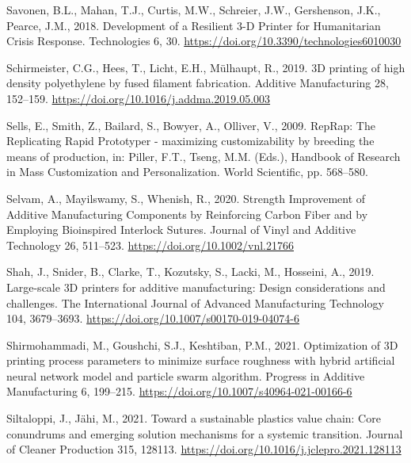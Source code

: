 \documentclass[
  12pt,
]{article}
\newlength{\cslhangindent}
\newlength{\cslentryspacingunit} %
\newenvironment{CSLReferences}[2] %
 {%
  \setlength{\parindent}{0pt}
  \ifodd #1
  \let\oldpar\par
  \def\par{\hangindent=\cslhangindent\oldpar}
  \fi
  \setlength{\parskip}{#2\cslentryspacingunit}
 }%
 {}
\begin{document}
\begin{CSLReferences}{1}{0}
\leavevmode{}%
Savonen, B.L., Mahan, T.J., Curtis, M.W., Schreier, J.W., Gershenson,
J.K., Pearce, J.M., 2018. Development of a {Resilient} 3-{D Printer} for
{Humanitarian Crisis Response}. Technologies 6, 30.
\url{https://doi.org/10.3390/technologies6010030}

\leavevmode{}%
Schirmeister, C.G., Hees, T., Licht, E.H., Mülhaupt, R., 2019. {3D}
printing of high density polyethylene by fused filament fabrication.
Additive Manufacturing 28, 152--159.
\url{https://doi.org/10.1016/j.addma.2019.05.003}

\leavevmode{}%
Sells, E., Smith, Z., Bailard, S., Bowyer, A., Olliver, V., 2009.
{RepRap}: {The Replicating Rapid Prototyper} - maximizing
customizability by breeding the means of production, in: Piller, F.T.,
Tseng, M.M. (Eds.), Handbook of {Research} in {Mass Customization} and
{Personalization}. {World Scientific}, pp. 568--580.

\leavevmode{}%
Selvam, A., Mayilswamy, S., Whenish, R., 2020. Strength {Improvement} of
{Additive Manufacturing Components} by {Reinforcing Carbon Fiber} and by
{Employing Bioinspired Interlock Sutures}. Journal of Vinyl and Additive
Technology 26, 511--523. \url{https://doi.org/10.1002/vnl.21766}

\leavevmode{}%
Shah, J., Snider, B., Clarke, T., Kozutsky, S., Lacki, M., Hosseini, A.,
2019. Large-scale {3D} printers for additive manufacturing: Design
considerations and challenges. The International Journal of Advanced
Manufacturing Technology 104, 3679--3693.
\url{https://doi.org/10.1007/s00170-019-04074-6}

\leavevmode{}%
Shirmohammadi, M., Goushchi, S.J., Keshtiban, P.M., 2021. Optimization
of {3D} printing process parameters to minimize surface roughness with
hybrid artificial neural network model and particle swarm algorithm.
Progress in Additive Manufacturing 6, 199--215.
\url{https://doi.org/10.1007/s40964-021-00166-6}

\leavevmode{}%
Siltaloppi, J., Jähi, M., 2021. Toward a sustainable plastics value
chain: {Core} conundrums and emerging solution mechanisms for a systemic
transition. Journal of Cleaner Production 315, 128113.
\url{https://doi.org/10.1016/j.jclepro.2021.128113}


\end{CSLReferences}
\end{document}
